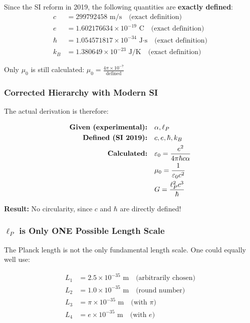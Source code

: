 	\begin{tcolorbox}[colback=green!5!white,colframe=green!75!black,title=Modern SI Base]
		Since the SI reform in 2019, the following quantities are \textbf{exactly defined}:
		\begin{align}
			c &= 299792458 \text{ m/s} \quad \text{(exact definition)}\\
			e &= 1.602176634 \times 10^{-19} \text{ C} \quad \text{(exact definition)}\\
			\hbar &= 1.054571817 \times 10^{-34} \text{ J·s} \quad \text{(exact definition)}\\
			k_B &= 1.380649 \times 10^{-23} \text{ J/K} \quad \text{(exact definition)}
		\end{align}
		
		Only $\mu_0$ is still calculated: $\mu_0 = \frac{4\pi \times 10^{-7}}{\text{defined}}$
	\end{tcolorbox}
	
	\subsubsection{Corrected Hierarchy with Modern SI}
	
	The actual derivation is therefore:
	
	\begin{align}
		\text{\textbf{Given (experimental):}} &\quad \alpha, \ell_P\\
		\text{\textbf{Defined (SI 2019):}} &\quad c, e, \hbar, k_B\\
		\text{\textbf{Calculated:}} &\quad \varepsilon_0 = \frac{e^2}{4\pi\hbar c \alpha}\\
		&\quad \mu_0 = \frac{1}{\varepsilon_0 c^2}\\
		&\quad G = \frac{\ell_P^2 c^3}{\hbar}
	\end{align}
	
	\textbf{Result:} No circularity, since $c$ and $\hbar$ are directly defined!
	
	\subsubsection{$\ell_P$ is Only ONE Possible Length Scale}
	
	The Planck length is not the only fundamental length scale. One could equally well use:
	
	\begin{align}
		L_1 &= 2.5 \times 10^{-35} \text{ m} \quad \text{(arbitrarily chosen)}\\
		L_2 &= 1.0 \times 10^{-35} \text{ m} \quad \text{(round number)}\\
		L_3 &= \pi \times 10^{-35} \text{ m} \quad \text{(with } \pi \text{)}\\
		L_4 &= e \times 10^{-35} \text{ m} \quad \text{(with } e \text{)}
	\end{align}
	
